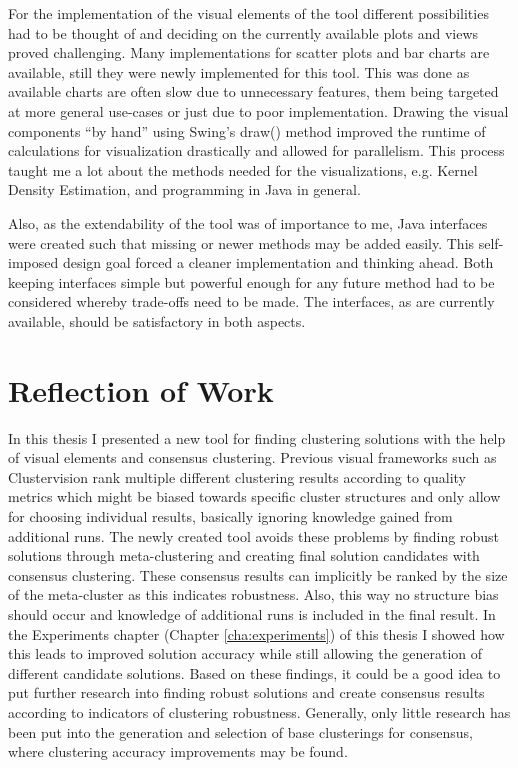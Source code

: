 \documentclass[
	a4paper,
	english,
	twoside,
	openright,               
	11pt                            
	]{report}
\begin{document}
For the implementation of the visual elements of the tool different possibilities had to be thought of and deciding on the currently available plots and views proved challenging. Many implementations for scatter plots and bar charts are available, still they were newly implemented for this tool. This was done as available charts are often slow due to unnecessary features, them being targeted at more general use-cases or just due to poor implementation. Drawing the visual components ``by hand'' using Swing's \cite{javaswing} draw() method improved the runtime of calculations for visualization drastically and allowed for parallelism. This process taught me a lot about the methods needed for the visualizations, e.g. Kernel Density Estimation, and programming in Java in general. 

Also, as the extendability of the tool was of importance to me, Java interfaces were created such that missing or newer methods may be added easily. This self-imposed design goal forced a cleaner implementation and thinking ahead. Both keeping interfaces simple but powerful enough for any future method had to be considered whereby trade-offs need to be made. The interfaces, as are currently available, should be satisfactory in both aspects.

\section{Reflection of Work}
In this thesis I presented a new tool for finding clustering solutions with the help of visual elements and consensus clustering. Previous visual frameworks such as Clustervision \cite{Kwon2018ClustervisionVS} rank multiple different clustering results according to quality metrics which might be biased towards specific cluster structures and only allow for choosing individual results, basically ignoring knowledge gained from additional runs. The newly created tool avoids these problems by finding robust solutions through meta-clustering and creating final solution candidates with consensus clustering. These consensus results can implicitly be ranked by the size of the meta-cluster as this indicates robustness. Also, this way no structure bias should occur and knowledge of additional runs is included in the final result. In the Experiments chapter (Chapter \ref{cha:experiments}) of this thesis I showed how this leads to improved solution accuracy while still allowing the generation of different candidate solutions. Based on these findings, it could be a good idea to put further research into finding robust solutions and create consensus results according to indicators of clustering robustness. Generally, only little research has been put into the generation and selection of base clusterings for consensus, where clustering accuracy improvements may be found.
\end{document}
